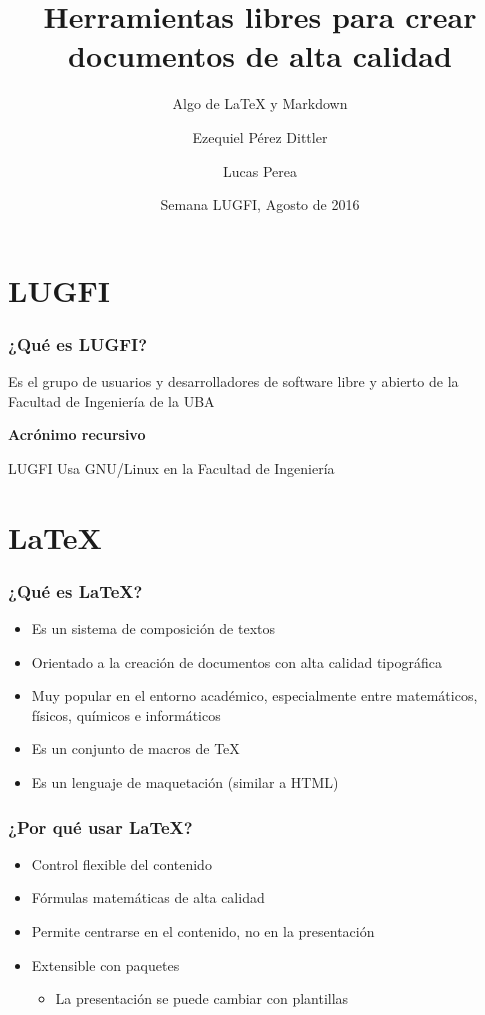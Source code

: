 \documentclass[svgnames]{beamer}
\title{Herramientas libres para crear documentos de alta calidad}
\subtitle{Algo de {\LaTeX} y Markdown}
\author{Ezequiel Pérez Dittler \and Lucas Perea}
\date{Semana LUGFI, Agosto de 2016}
\begin{document}
\frame{\titlepage}

\section{LUGFI}

\begin{frame}
  \frametitle{¿Qué es LUGFI?}

  \centering

  Es el grupo de usuarios y desarrolladores de software libre y abierto de la Facultad de Ingeniería de la UBA

  \vfill

  \textbf{Acrónimo recursivo}

  \medskip

  LUGFI Usa GNU/Linux en la Facultad de Ingeniería
\end{frame}

\section{\LaTeX}

\begin{frame}
  \frametitle{¿Qué es \LaTeX?}
  \begin{itemize}
    \item Es un sistema de composición de textos
    \item Orientado a la creación de documentos con alta calidad tipográfica
    \item Muy popular en el entorno académico, especialmente entre matemáticos, físicos, químicos e informáticos
    \item Es un conjunto de macros de \TeX
    \item Es un lenguaje de maquetación (similar a HTML)
  \end{itemize}
\end{frame}

\begin{frame}
  \frametitle{¿Por qué usar \LaTeX?}
  \begin{itemize}
    \item Control flexible del contenido
    \item Fórmulas matemáticas de alta calidad
    \item Permite centrarse en el contenido, no en la presentación
    \item Extensible con paquetes
    \begin{itemize}
      \item La presentación se puede cambiar con plantillas
    \end{itemize}
  \end{itemize}
\end{frame}
\end{document}
